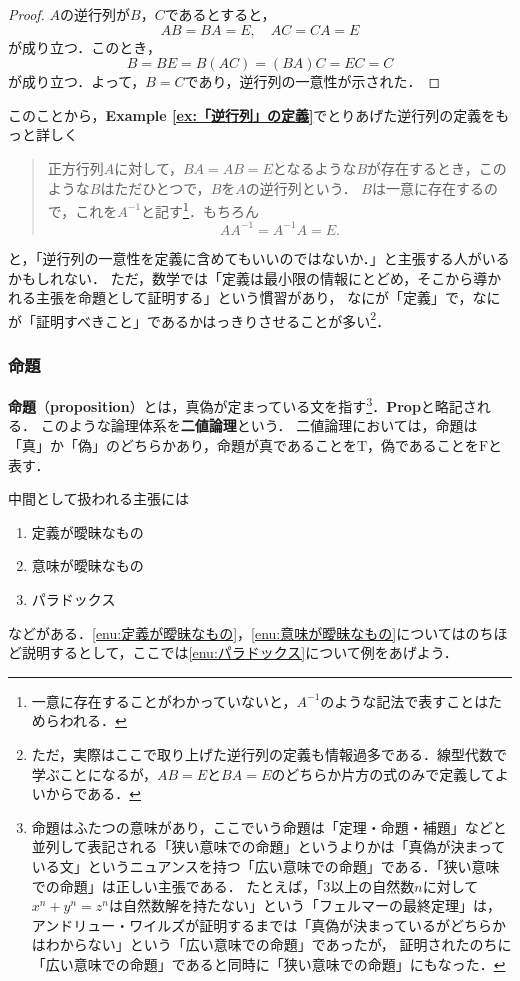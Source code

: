 \documentclass[a4paper,11pt]{ltjsarticle}
\renewcommand{\emph}[1]{\textbf{#1}}
\newenvironment{tleftbar}{\begin{tbleftline}\setlength{\parindent}{1\zw}}{\end{tbleftline}}
\newcommand{\exref}[1]{{\bfseries\sffamily Example \ref{ex:#1}}}
\begin{document}
\begin{tleftbar}
	\begin{proof}
	$A$の逆行列が$B$，$C$であるとすると，
	\[
		AB=BA=E,\quad AC=CA=E
	\]
	が成り立つ．このとき，
	\[
		B=BE=B(AC)=(BA)C=EC=C
	\]
	が成り立つ．よって，$B=C$であり，逆行列の一意性が示された．
	\end{proof}
\end{tleftbar}

このことから，\exref{「逆行列」の定義}でとりあげた逆行列の定義をもっと詳しく

\begin{quote}
	正方行列$A$に対して，$BA = AB =E$となるような$B$が存在するとき，このような$B$はただひとつで，$B$を$A$の逆行列という．
	$B$は一意に存在するので，これを$A^{-1}$と記す\footnote{一意に存在することがわかっていないと，$A^{-1}$のような記法で表すことはためらわれる．}．もちろん
	\[
		AA^{-1}=A^{-1}A=E.
	\]
\end{quote}
と，「逆行列の一意性を定義に含めてもいいのではないか．」と主張する人がいるかもしれない．
ただ，数学では「定義は最小限の情報にとどめ，そこから導かれる主張を命題として証明する」という慣習があり，
なにが「定義」で，なにが「証明すべきこと」であるかはっきりさせることが多い\footnote{ただ，実際はここで取り上げた逆行列の定義も情報過多である．線型代数で学ぶことになるが，$AB=E$と$BA=E$のどちらか片方の式のみで定義してよいからである．}．

\subsubsection{命題}

\emph{命題}（\emph{proposition}）とは，真偽が定まっている文を指す\footnote{命題はふたつの意味があり，ここでいう命題は「定理・命題・補題」などと並列して表記される「狭い意味での命題」というよりかは「真偽が決まっている文」というニュアンスを持つ「広い意味での命題」である．「狭い意味での命題」は正しい主張である．
	たとえば，「$3$以上の自然数$n$に対して$x^n + y^n =z^n$は自然数解を持たない」という「フェルマーの最終定理」は，
	アンドリュー・ワイルズが証明するまでは「真偽が決まっているがどちらかはわからない」という「広い意味での命題」であったが，
	証明されたのちに「広い意味での命題」であると同時に「狭い意味での命題」にもなった．}．\textbf{Prop}と略記される．
このような論理体系を\emph{二値論理}という．
二値論理においては，命題は「真」か「偽」のどちらかあり，命題が真であることを$\mathrm{T}$，偽であることを$\mathrm{F}$と表す．

中間として扱われる主張には
\begin{enumerate}[(1)]
	\item 定義が曖昧なもの \label{enu:定義が曖昧なもの}
	\item 意味が曖昧なもの \label{enu:意味が曖昧なもの}
	\item パラドックス \label{enu:パラドックス}
\end{enumerate}
などがある．\ref{enu:定義が曖昧なもの}，\ref{enu:意味が曖昧なもの}についてはのちほど説明するとして，ここでは\ref{enu:パラドックス}について例をあげよう．
\end{document}
